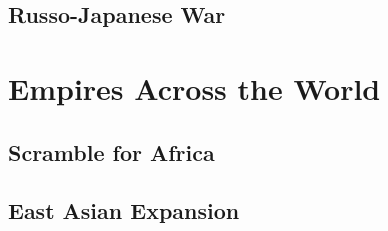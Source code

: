 \subsection*{Russo-Japanese War}

\section{Empires Across the World}

\subsection*{Scramble for Africa}

\subsection*{East Asian Expansion}

